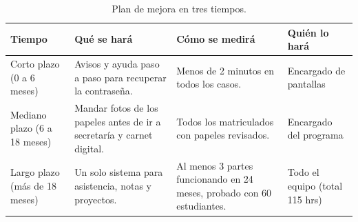 \begin{table}[htbp]
    \centering
    \caption{Plan de mejora en tres tiempos.}
    \label{tab:plan_mejora}
    \renewcommand{\arraystretch}{1.60}
    \small
    \begin{tabularx}{\textwidth}{L L L L}
        \toprule
        \textbf{Tiempo} & \textbf{Qué se hará} & \textbf{Cómo se medirá} & \textbf{Quién lo hará} \\
        \midrule
        Corto plazo (0 a 6 meses) & Avisos y ayuda paso a paso para recuperar la contraseña. & Menos de 2 minutos en todos los casos. & Encargado de pantallas \\
        \addlinespace
        Mediano plazo (6 a 18 meses) & Mandar fotos de los papeles antes de ir a secretaría y carnet digital. & Todos los matriculados con papeles revisados. & Encargado del programa \\
        \addlinespace
        Largo plazo (más de 18 meses) & Un solo sistema para asistencia, notas y proyectos. & Al menos 3 partes funcionando en 24 meses, probado con 60 estudiantes. & Todo el equipo (total 115 hrs) \\
        \bottomrule
    \end{tabularx}
\end{table}

